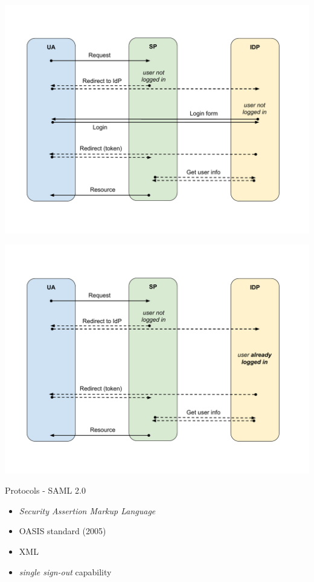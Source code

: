 \documentclass[ignorenonframetext,aspectratio=169]{beamer}
\providecommand{\tightlist}{%
  \setlength{\itemsep}{0pt}\setlength{\parskip}{0pt}}
\begin{document}
\begin{frame}[plain]
\centering
\includegraphics[height=\paperheight]{fedsso-proto-6.pdf}
\end{frame}

\begin{frame}[plain]
\centering
\includegraphics[height=\paperheight]{fedsso-proto-7.pdf}
\end{frame}

\begin{frame}{Protocols - SAML 2.0}

\begin{itemize}
\tightlist
\item \emph{Security Assertion Markup Language}
\item OASIS standard (2005)
\item XML
\item \emph{single sign-out} capability
\end{itemize}

\end{frame}
\end{document}
